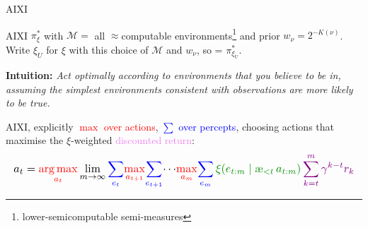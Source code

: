 \documentclass[10pt,aspectratio=169]{beamer}
\newcommand{\cM}{\mathcal{M}}
\DeclareMathOperator*{\argmax}{arg\,max}
\newcommand{\aes}{{\text{\ae}}}            %
\newcommand{\red}[1]{\textcolor{red}{#1}}
\newcommand{\blue}[1]{\textcolor{blue}{#1}}
\newcommand{\green}[1]{\textcolor{green!55!black}{#1}}
\newcommand{\purple}[1]{\textcolor{violet}{#1}}
\begin{document}
\begin{frame}{AIXI}
\begin{block}{AIXI}
$\pi_\xi^*$ with $\cM=$ all $\approx$computable environments\footnote{lower-semicomputable semi-measures} and prior $w_\nu = 2^{-K(\nu)}$.
Write $\xi_U$ for $\xi$ with this choice of $\cM$ and $w_\nu$, so  = $\pi_{\xi_U}^*$.
\end{block}
\textbf{Intuition:} \emph{Act optimally according
to environments that you believe to be in, assuming the simplest environments consistent with
observations are more likely to be true.}
\pause
\begin{block}{AIXI, explicitly}
\red{$\max$ over actions}, \blue{$\sum$ over percepts}, choosing actions that maximise the \green{$\xi$-weighted} \purple{discounted return}:
\[
\resizebox{\linewidth}{!}{$\displaystyle
    a_t = \red{\argmax_{a_t}}\lim_{m\to\infty}
        \blue{\sum_{e_t}}\red{\max_{a_{t+1}}}\blue{\sum_{e_{t+1}}}\!\cdots\!
      \red{\max_{a_m}}\blue{\sum_{e_m}} \,
      \green{\xi(e_{t:m}\mid \aes_{<t}\,a_{t:m})} \, 
      \purple{\sum_{k=t}^m 
        \gamma^{k-t} r_k} 
$}
\]
\end{block}
\end{frame}

\end{document}
